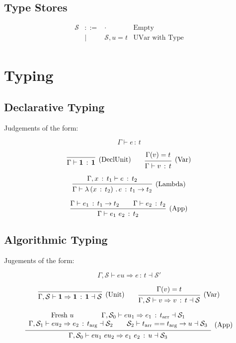 \documentclass{article}
\newcommand{\define}{::=}
\newcommand{\G}{\Gamma}
\newcommand{\St}{\mathcal{S}}
\newcommand{\unit}{\mathbf{1}}
\newcommand{\tp}{t}
\newcommand{\tarr}{t_{\text{arr}}}
\newcommand{\targ}{t_{\text{arg}}}
\newcommand{\uv}{u}
\newcommand{\eu}{eu}
\newcommand{\e}{e}
\newcommand{\x}{x}
\newcommand{\var}{v}
\newcommand{\nil}{\cdot}
\newcommand{\spc}{\qquad}
\newcommand{\eq}{==}
\renewcommand{\implies}{\Rightarrow}
\newcommand{\fresh}{\text{Fresh}\ }
\newcommand{\set}[2]{{#1} = {#2}}
\newcommand{\withtp}[2]{{#1} \,:\, {#2}}
\newcommand{\app}[2]{{#1}\ {#2}}
\newcommand{\lamtp}[3]{\lambda \left( {\withtp {#1} {#2}} \right) \,.\, {#3}}
\newcommand{\arr}[2]{{#1} \to {#2}}
\newcommand{\hastp}[3]{#1 \vdash {\withtp {#2} {#3}}}
\newcommand{\algtp}[6]{#1, #2 \vdash #3 \implies {\withtp {#4} {#5}} \dashv #6}
\newcommand{\equals}[4]{{#1} \vdash {#2} \eq {#3} \dashv {#4}}
\newcommand{\deduct}[3][]
{
  \begin{prooftree}
    \hypo{#2}
    \infer1[\text{#1}]{#3}
  \end{prooftree}
}
\begin{document}
\subsection{Type Stores}
\[
  \begin{array}{rcll}
    \St  & \define & \nil & \text{Empty} \\
         & \mid    & \St , {\set \uv \tp} & \text{UVar with Type}  \\
  \end{array}
\]

\section{Typing}

\subsection{Declarative Typing}

Judgements of the form:

\[ \hastp \G \e \tp \]

\[
\deduct
  {}
  {\hastp \G \unit \unit}
  {\text{(DeclUnit)}}
\spc
\deduct
  {\G(\var) = \tp}
  {\hastp \G \var \tp}
  {\text{(Var)}}
\]

\[
  \deduct
  {\hastp {\G, {\withtp \x {\tp_1}}} \e {\tp_2}}
  {\hastp \G {\lamtp {\x} {\tp_2} {\e}} {\arr {\tp_1} {\tp_2}}}
  {\text{(Lambda)}}
\]

\[
  \deduct
  {\hastp \G {\e_1} {\arr {\tp_1} {\tp_2}} \spc 
   \hastp \G {\e_2} {\tp_2}}
  {\hastp \G {\app {\e_1} {\e_2}} {\tp_2}}
  {\text{(App)}}
\]

\subsection{Algorithmic Typing}

Jugements of the form:

\[ \algtp \G \St \eu \e \tp \St' \]

\[
  \deduct
  {}
  {\algtp \G \St \unit \unit \unit \St}
  {\text{(Unit)}}
  \spc
  \deduct
  {\G(\var) = \tp}
  {\algtp \G \St \var \var \tp \St}
  {\text{(Var)}}
\]

\[
  \deduct
  {\begin{array}{c}
    \fresh \uv \spc \spc
   \algtp \G {\St_0} {\eu_1} {\e_1} \tarr {\St_1} \\
   \algtp \G {\St_1} {\eu_2} {\e_2} \targ {\St_2} \spc
   \equals {\St_2} {\tarr} {\arr {\targ} \uv} {\St_3}
   \end{array}
  }
  {\algtp \G {\St_0} {\app {\eu_1} {\eu_2}} {\app {\e_1} {\e_2}} {\uv} {\St_3}}
  {\text{(App)}}
\]
\end{document}
